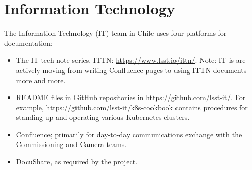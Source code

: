 \section{Information Technology}

The Information Technology (IT) team in Chile uses four platforms for documentation:

\begin{itemize}

	\item The IT tech note series, ITTN: \url{https://www.lsst.io/ittn/}. Note: IT is are actively moving from writing Confluence pages to using ITTN documents more and more.
	\item README files in GitHub repositories in \url{https://github.com/lsst-it/}. For example, https://github.com/lsst-it/k8s-cookbook contains procedures for standing up and operating various Kubernetes clusters.
	\item Confluence; primarily for day-to-day communications exchange with the Commissioning and Camera teams.
	\item DocuShare, as required by the project.
	
\end{itemize}
